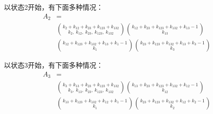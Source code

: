 \documentclass[cn,hazy,egreen,14pt,normal]{elegantnote}
\begin{document}
以状态2开始，有下面多种情况：
\begin{align*}
    A_2 &= \\ 
    &\binom{k_2 + k_{12} + k_{23} + k_{123} +k_{132}}{k_2, ~k_{12}, ~k_{23}, ~k_{123}, ~k_{132}} 
    \binom{k_{12} +k_{23} + k_{123} +k_{132} + k_{13} - 1}{k_{13}} \\
    &\binom{k_{12} + k_{123} + k_{132} +k_{13} +k_1 -1}{k_1} \binom{k_{23} +k_{123} +k_{132} +k_{13} +k_3 -1}{k_3}
\end{align*}

以状态3开始，有下面多种情况：
\begin{align*}
    A_3 &= \\ 
    &\binom{k_3 + k_{13} + k_{23} + k_{123} +k_{132}}{k_3, ~k_{13}, ~k_{23}, ~k_{123}, ~k_{132}} 
    \binom{k_{13} +k_{23} + k_{123} +k_{132} + k_{12} - 1}{k_{12}} \\
    &\binom{k_{13} + k_{123} + k_{132} +k_{12} +k_1 -1}{k_1} \binom{k_{23} +k_{123} +k_{132} +k_{12} +k_2 -1}{k_2}
\end{align*}
\end{document}

